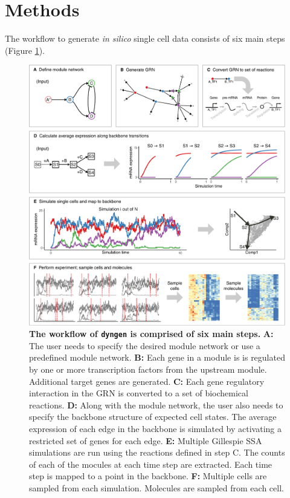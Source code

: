 \section{Methods}
The workflow to generate \textit{in silico} single cell data consists of six main steps (Figure \ref{fig:explain_methods}). 

\begin{figure}[htb!]
	\centering
	\includegraphics[width=\hugefigure]{fig/explain_methods} 
	\caption{\textbf{The workflow of \texttt{dyngen} is comprised of six main steps.} \textbf{A:} The user needs to specify the desired module network or use a predefined module network. \textbf{B:} Each gene in a module is is regulated by one or more transcription factors from the upstream module. Additional target genes are generated. \textbf{C:} Each gene regulatory interaction in the GRN is converted to a set of biochemical reactions. \textbf{D:} Along with the module network, the user also needs to specify the backbone structure of expected cell states. The average expression of each edge in the backbone is simulated by activating a restricted set of genes for each edge. \textbf{E:} Multiple Gillespie SSA simulations are run using the reactions defined in step C.  The counts of each of the mocules at each time step are extracted. Each time step is mapped to a point in the backbone. \textbf{F:} Multiple cells are sampled from each simulation. Molecules are sampled from each cell.}
	\label{fig:explain_methods}
\end{figure}

